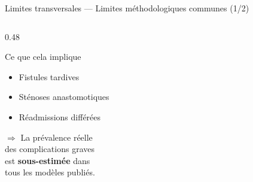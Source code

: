 \documentclass[aspectratio=169]{beamer}
\begin{document}
\begin{frame}{Limites transversales --- Limites méthodologiques communes (1/2)}
\begin{columns}[T]
\begin{column}{0.48\textwidth}
\begin{block}{Ce que cela implique}
\begin{itemize}
          \item Fistules tardives
          \item Sténoses anastomotiques
          \item Réadmissions différées
        \end{itemize}
        \vspace{6pt}
        $\Rightarrow$ La prévalence réelle\\
        des complications graves\\
        est \textbf{sous-estimée} dans\\
        tous les modèles publiés.
      \end{block}
    \end{column}
  \end{columns}
\end{frame}
\end{document}
